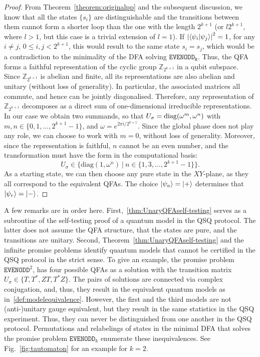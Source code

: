 \documentclass[../main.tex]{subfiles}
\begin{document}
\begin{proof}
From Theorem~\ref{theorem:originalpp} and the subsequent discussion, we know that all the states $\{s_i\}$  are distinguishable and the transitions between them cannot form a shorter loop than the one with the length $2^{k+1}$ (or $l 2^{k+1}$, where $l>1$, but this case is a trivial extension of $l=1$).
If $\left|\braket{\psi_i}{\psi_j}\right|^2= 1$, for any $i\neq j$, $0 \leq i,j< 2^{k+1}$, this would result to the same state $s_i=s_j$, which would be a contradiction to the minimality of the DFA solving $\mathtt{EVENODD_k}$. Thus, the QFA forms a faithful representation of the cyclic group $\mathbb{Z}_{2^{k+1}}$ in a qubit subspace.  Since $\mathbb{Z}_{2^{k+1}}$ is abelian and finite, all its representations are also abelian and unitary (without loss of generality). In particular, the associated matrices all commute, and hence can be jointly diagonalised.
 Therefore, any representation of $\mathbb{Z}_{2^{k+1}}$ decomposes as a direct sum of one-dimensional irreducible representations. In our case we obtain two summands, so that $U_\sigma =\operatorname{diag}(\omega^m,\omega^n)$ with \(m, n \in \{0, 1, \dots, 2^{k+1} - 1\}\), and $\omega = e^{2\pi i / 2^{k+1}}$. 
Since the global phase does not play any role, we can choose to work with $m=0$, without loss of generality. Moreover, since the representation is faithful, $n$ cannot be an even number, and the transformation must have the form in the computational basis: 
\begin{equation}
   U_\sigma\in\{\mathrm{diag}(1, \omega^n) \ |\ n\in \{ 1,3, \dots, 2^{k+1} - 1\}\}. 
\end{equation}
As a starting state, we can then choose any pure state in the $XY$-plane, as they all correspond to the equivalent QFAs. The choice $\ket{\psi_a}=\ket{+}$ determines that $\ket{\psi_r}=\ket{-}$.
\end{proof}


A few remarks are in order here. First,~\cref{thm:UnaryQFAself-testing} serves as a subroutine of the self-testing proof of a quantum model in the QSQ protocol. The latter does not assume the QFA structure, that the states are pure, and the transitions are unitary.
Second, Theorem~\ref{thm:UnaryQFAself-testing} and the infinite promise problems identify quantum models that cannot be certified in the QSQ protocol in the strict sense.  To give an example, the promise problem $\mathtt{EVENODD}^2$, has four possible QFAs as a solution with the transition matrix $U_\sigma\in\{T, T^*, ZT, T^*Z\}$. The pairs of solutions are connected via complex conjugation, and, thus, they result in the equivalent quantum models as in~\cref{def:modelequivalence}. However, the first and the third models are not (anti-)unitary gauge equivalent, but they result in the same statistics in the QSQ experiment. Thus, they can never be distinguished from one another in the QSQ protocol. Permutations and relabelings of states in the minimal DFA that solves the promise problem $\mathtt{EVENODD}_k$ enumerate these inequivalences. See Fig.~\ref{fig:tautomaton} for an example for $k=2$.
\end{document}
